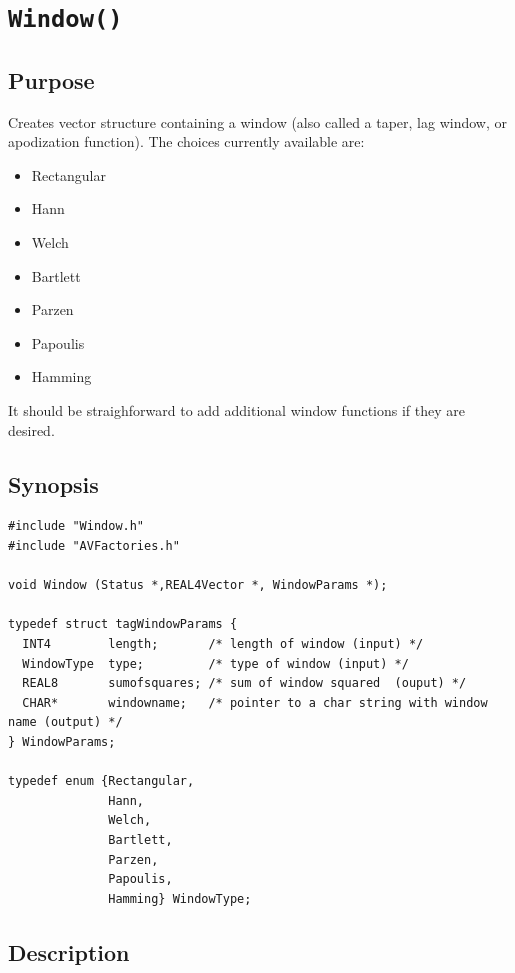 \documentclass{article}
\begin{document}
\section{{\tt Window()}}

\subsection{Purpose}

Creates vector structure containing a window (also called
a taper, lag window, or apodization function).  The choices
currently available are:
\begin{itemize}
\item Rectangular
\item Hann
\item Welch
\item Bartlett
\item Parzen
\item Papoulis
\item Hamming
\end{itemize}
It should be straighforward to add additional window functions if
they are desired.

\subsection{Synopsis}


\begin{verbatim}
#include "Window.h"
#include "AVFactories.h"

void Window (Status *,REAL4Vector *, WindowParams *);

typedef struct tagWindowParams {
  INT4        length;       /* length of window (input) */
  WindowType  type;         /* type of window (input) */
  REAL8       sumofsquares; /* sum of window squared  (ouput) */
  CHAR*       windowname;   /* pointer to a char string with window name (output) */
} WindowParams;

typedef enum {Rectangular,
              Hann,
              Welch,
              Bartlett,
              Parzen,
              Papoulis,
              Hamming} WindowType;

\end{verbatim}
\subsection{Description}
\end{document}

